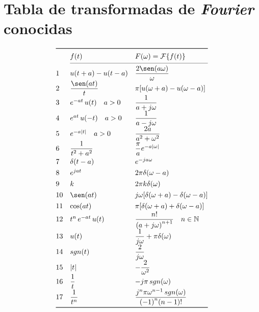 \section{Tabla de transformadas de \emph{Fourier} conocidas}

\begin{equation*}
\def\arraystretch{1.3}
\begin{array}{@{}lll@{}}
\toprule
 & f(t) & F(\omega)=\mathcal{F}\{f(t)\} \\
\cmidrule(l){2-3}
 1 & u(t+a)-u(t-a)
   & \dfrac{2\sen(a\omega)}{\omega}\\
 2 & \dfrac{\sen(at)}{t}
   & \pi[u(\omega+a)-u(\omega-a)]\\
 3 & e^{-at}\,u(t)\quad a>0
   & \dfrac{1}{a+j\omega}\\
 4 & e^{at}\,u(-t)\quad a>0
   & \dfrac{1}{a-j\omega}\\
 5 & e^{-a|t|}\quad a>0
   & \dfrac{2a}{a^2+\omega^2}\\
 6 & \dfrac{1}{t^2+a^2}
   & \dfrac{\pi}{a}e^{-a|\omega|}\\
 7 & \delta(t-a)
   & e^{-ja\omega}\\
 8 & e^{jat}
   & 2\pi\delta(\omega-a)\\
 9 & k
   & 2\pi k\delta(\omega)\\
10 & \sen(at)
   & j\omega[\delta(\omega+a)-\delta(\omega-a)]\\
11 & \cos(at)
   & \pi[\delta(\omega+a)+\delta(\omega-a)]\\
12 & t^n\,e^{-at}\,u(t)
   & \dfrac{n!}{{(a+j\omega)}^{n+1}}\quad n\in\mathbb{N}\\
13 & u(t)
   & \dfrac{1}{j\omega}+\pi\delta(\omega)\\
14 & sgn(t)
   & \dfrac{2}{j\omega}\\
15 & |t|
   & -\dfrac{2}{\omega^2}\\
16 & \dfrac{1}{t}
   & -j\pi\,sgn(\omega)\\
17 & \dfrac{1}{t^n}
   & \dfrac{j^n\pi{\omega}^{n-1}\,sgn(\omega)}{{(-1)}^n(n-1)!}\\
\bottomrule
\end{array}
\end{equation*}

